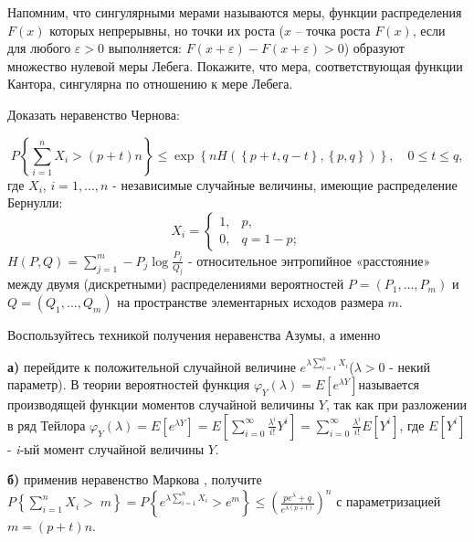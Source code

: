 \begin{problem}
Напомним, что сингулярными мерами называются меры, функции распределения $F(x)$ которых непрерывны, но точки их роста ($x$ -- точка роста $F(x)$, если для любого $\varepsilon >0$ выполняется: $F(x+\varepsilon )-F(x+\varepsilon )>0$) образуют множество нулевой меры Лебега. Покажите, что мера, соответствующая функции Кантора, сингулярна по отношению к мере Лебега.

\end{problem}


\begin{problem}
Доказать неравенство Чернова:

\[P\left\{\sum _{i=1}^{n}X_{i} >(p+t)n \right\}\le \exp \left\{nH\left(\left\{p+t,q-t\right\},\left\{p,q\right\}\right)\right\},\quad 0\le t\le q,\] 
где $X_{i} $, $i=1,...,n$ - независимые случайные величины, имеющие распределение Бернулли:
\[X_{i} =\left\{\begin{array}{cc} {1,} & {p,} \\ {0,} & {q=1-p;} \end{array}\right. \] 
$H\left(P,Q\right)=\sum _{j=1}^{m}-P_{j} \log \frac{P_{j} }{Q_{j} }  $ - относительное энтропийное «расстояние» между двумя (дискретными) распределениями вероятностей $P=\left(P_{1} ,\ldots ,P_{m} \right)$ и $Q=\left(Q_{1} ,\ldots ,Q_{m} \right)$ на пространстве элементарных исходов размера $m$.

\begin{ordre}
 
Воспользуйтесь техникой получения неравенства Азумы, а именно 

\noindent \textbf{а)} перейдите к положительной случайной величине $e^{\lambda \sum _{i=1}^{n}X_{i}  } $($\lambda >0$ - некий параметр). В теории вероятностей функция $\varphi _{Y} (\lambda )=E\left[e^{\lambda Y} \right]$называется производящей функции моментов случайной величины $Y$, так как при разложении в ряд Тейлора $\varphi _{Y} (\lambda )=E\left[e^{\lambda Y} \right]=E\left[\sum _{i=0}^{\infty }\frac{\lambda ^{i} }{i!} Y^{i}  \right]=\sum _{i=0}^{\infty }\frac{\lambda ^{i} }{i!} E\left[Y^{i} \right] $, где $E\left[Y^{i} \right]$ - \textit{i}-ый момент случайной величины $Y$.

\noindent \textbf{б)} применив неравенство Маркова , получите $P\left\{\sum _{i=1}^{n}X_{i} > \; m\right\}=P\left\{e^{\lambda \sum _{i=1}^{n}X_{i}  } >e^{m} \right\}\le \left(\frac{pe^{\lambda } +q}{e^{\lambda (p+t)} } \right)^{n} $ с параметризацией $m=(p+t)n$.


\end{ordre}
\end{problem}
